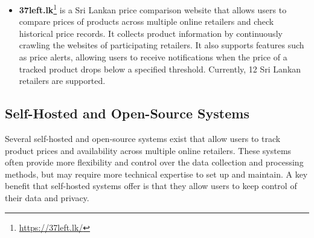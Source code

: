 \begin{itemize}
    \item \textbf{37left.lk}\footnote{\url{https://37left.lk/}} is a Sri Lankan price comparison website that allows users to compare prices of products across multiple online retailers and check historical price records.
    It collects product information by continuously crawling the websites of participating retailers.
    It also supports features such as price alerts, allowing users to receive notifications when the price of a tracked product drops below a specified threshold.
    Currently, 12 Sri Lankan retailers are supported.\cite{37left_faq}

\end{itemize}

\subsection{Self-Hosted and Open-Source Systems}\label{sec:related_work_self_hosted}
Several self-hosted and open-source systems exist that allow users to track product prices and availability across multiple online retailers.
These systems often provide more flexibility and control over the data collection and processing methods,
but may require more technical expertise to set up and maintain.
A key benefit that self-hosted systems offer is that they allow users to keep control of their data and privacy.

